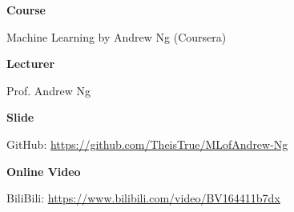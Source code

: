 \textbf{Course}

Machine Learning by Andrew Ng (Coursera)

\vspace{2ex}

\textbf{Lecturer}

Prof. Andrew Ng

\vspace{2ex}

\textbf{Slide}

GitHub: \url{https://github.com/TheisTrue/MLofAndrew-Ng}

\vspace{2ex}

\textbf{Online Video}

BiliBili: \url{https://www.bilibili.com/video/BV164411b7dx}
